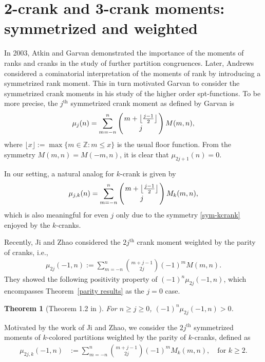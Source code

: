 \documentclass[12pt]{amsart}
\numberwithin{equation}{section}
\theoremstyle{plain}
\newtheorem{theorem}{Theorem}[section]
\theoremstyle{definition}
\begin{document}
\section{2-crank and 3-crank moments: symmetrized and weighted}\label{sec:3}

In 2003, Atkin and Garvan \cite{AG} demonstrated the importance of the moments of ranks and cranks in the study of further partition congruences. Later, Andrews \cite{Andr3} considered a cominatorial interpretation of the moments of rank by introducing a symmetrized rank moment. This in turn motivated Garvan \cite{Gar2} to consider the symmetrized crank moments in his study of the higher order spt-functions. To be more precise, the $j^{\text{th}}$ symmetrized crank moment as defined by Garvan \cite{Gar2} is
\begin{align*}
\mu_{j}(n)=\sum_{m=-n}^{n}\left(m+\left\lfloor\frac{j-1}{2}\right\rfloor\atop j\right)M(m,n),
\end{align*}
where $\lfloor x \rfloor:=\max\{m\in\mathbb{Z}: m\leq x\}$ is the usual floor function. From the symmetry $M(m,n)=M(-m,n)$, it is clear that $\mu_{2j+1}(n)=0$.

In our setting, a natural analog for $k$-crank is given by
\begin{align*}
\mu_{j,k}(n)=\sum_{m=-n}^{n}\left(m+\left\lfloor\frac{j-1}{2}\right\rfloor\atop j\right)M_{k}(m,n),
\end{align*}
which is also meaningful for even $j$ only due to the symmetry \eqref{sym-kcrank} enjoyed by the $k$-cranks.

Recently, Ji and Zhao \cite{JZ} considered the $2j^{\text{th}}$ crank moment weighted by the parity of cranks, i.e.,
\begin{align*}
\mu_{2j}(-1,n):=\sum_{m=-n}^{n}\binom{m+j-1}{2j}(-1)^{m}M(m,n).
\end{align*}
They showed the following positivity property of $(-1)^{n}\mu_{2j}(-1,n)$, which encompasses Theorem~\ref{parity results} as the $j=0$ case.
\begin{theorem}[Theorem 1.2 in \cite{JZ}]\label{thm:J-Z}
For $n\geq j\geq0$, $(-1)^{n}\mu_{2j}(-1,n)>0$.
\end{theorem}

Motivated by the work of Ji and Zhao, we consider the $2j^{\text{th}}$ symmetrized moments of $k$-colored partitions weighted by the parity of $k$-cranks, defined as
\begin{align}
\mu_{2j,k}(-1,n) &:=\sum_{m=-n}^{n}\binom{m+j-1}{2j}(-1)^{m}M_{k}(m,n), \quad \textrm{for } k\geq 2.\label{mu2jk-1}
\end{align}
\end{document}
